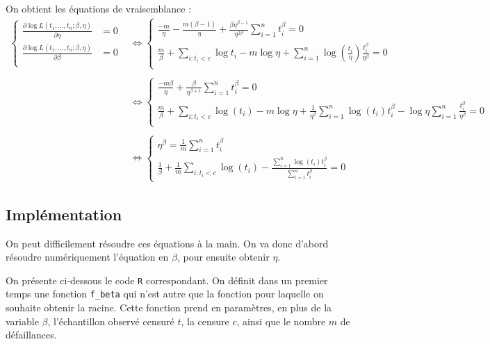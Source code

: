 \documentclass[a4paper]{report}
\begin{document}
     On obtient les équations de vraisemblance :
     \begin{align}
     	\begin{cases}
		\frac{\partial \log L(t_1,...,t_n;\beta,\eta)}{\partial \eta} & = 0 \nonumber\\
	 	\frac{\partial \log L(t_1,...,t_n;\beta,\eta)}{\partial \beta} & = 0 \nonumber\\
     	\end{cases}
     	&\iff 
      	\begin{cases}
		\frac{-m}{\eta} - \frac{m(\beta -1)}{\eta} + \frac{\beta \eta^{\beta-1}}		{\eta^{2\beta}} \sum_{i=1}^{n} {t_i^\beta} = 0  \nonumber\\
	 	\frac{m}{\beta} + \sum_{i:t_i<c}{\log t_i} - m \log \eta + \sum_{i=1}^{n} {\log (\frac{t_i}{\eta}) \frac{t_i^\beta}{\eta^\beta}} = 0  \nonumber\\
     	\end{cases}
   	\\
   	 \nonumber\\
   	&\iff
   	\begin{cases}
     		\frac{-m\beta}{\eta} + \frac{\beta}{\eta^{\beta+1}} \sum_{i=1}^{n} {t_i^\beta} = 0 \nonumber\\
		\frac{m}{\beta} +  \sum_{i:t_i<c}{\log (t_i)} - m\log \eta + \frac{1}{\eta^{\beta}} \sum_{i=1}^{n} {\log (t_i)} t_i^{\beta} - \log \eta \sum_{i=1}^{n} \frac{t_i^\beta}{\eta^\beta}  = 0 \nonumber\\
     	\end{cases}
     	\\
     	 \nonumber\\
     	&\iff
   	\begin{cases}
     		\eta^{\beta} = \frac{1}{m}  \sum_{i=1}^{n} {t_i^\beta} \label{eqEMV}\\
		\frac{1}{\beta} + \frac{1}{m} \sum_{i:t_i<c}{\log (t_i)} - \frac{\sum_{i=1}^{n}  {\log (t_i)} t_i^{\beta}}{\sum_{i=1}^{n} {t_i^{\beta}}}  = 0 
     	\end{cases}
\end{align}

\subsection{Implémentation}

On peut difficilement résoudre ces équations à la main. On va donc d'abord résoudre numériquement l'équation en $\beta$, pour ensuite obtenir $\eta$.

On présente ci-dessous le code \verb|R| correspondant. On définit dans un premier temps une fonction \verb|f_beta| qui n'est autre que la fonction pour laquelle on souhaite obtenir la racine. Cette fonction prend en paramètres, en plus de la variable $\beta$, l'échantillon observé censuré $t$, la censure $c$, ainsi que le nombre $m$ de défaillances.
\end{document}
